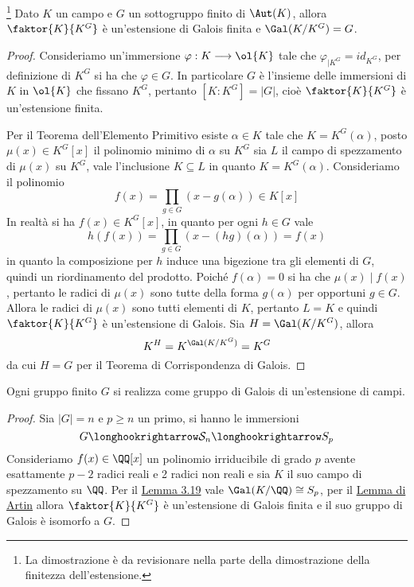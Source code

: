 \documentclass[11pt]{scrartcl}
\begin{document}
	\begin{lemma}
		\footnote{
			La dimostrazione è da revisionare nella parte della dimostrazione 
			della finitezza dell'estensione.
		}
		\label{lemma3.20}
		Dato $K$ un campo e $G$ un sottogruppo finito di $\Aut(K)$, allora 
		$\faktor{K}{K^G}$ è un'estensione di Galois finita e $\Gal(K/K^G) = G$.
	\end{lemma}
	
	\begin{proof}
		Consideriamo un'immersione $\varphi: K \longrightarrow \ol{K}$ tale che
		$\varphi_{\mid K^G} = id_{K^G}$, per definizione di $K^G$ si ha che 
		$\varphi \in G$. In particolare $G$ è l'insieme delle immersioni di $K$
		in $\ol{K}$ che fissano $K^G$, pertanto $[K:K^G] = |G|$, cioè $\faktor{K}{K^G}$
		è un'estensione finita. 
		
		Per il Teorema dell'Elemento Primitivo esiste $\alpha \in K$ tale che 
		$K = K^G(\alpha)$, posto $\mu(x) \in K^G[x]$ il polinomio minimo di $\alpha$
		su $K^G$ sia $L$ il campo di spezzamento di $\mu(x)$ su $K^G$, vale
		l'inclusione $K \subseteq L$ in quanto $K = K^G(\alpha)$. Consideriamo 
		il polinomio 
		\[
		f(x) = \prod_{g \in G}(x - g(\alpha)) \in K[x]
		\]
		In realtà si ha $f(x) \in K^G[x]$, in quanto per ogni $h \in G$ vale 
		\[
		h(f(x)) = \prod_{g \in G}(x - (hg)(\alpha)) = f(x)
		\]
		in quanto la composizione per $h$ induce una bigezione tra gli elementi di $G$,
		quindi un riordinamento del prodotto. Poiché $f(\alpha) = 0$ si ha che
		$\mu(x)\mid f(x)$, pertanto le radici di $\mu(x)$ sono tutte della forma
		$g(\alpha)$ per opportuni $g \in G$. Allora le radici di $\mu(x)$ sono
		tutti elementi di $K$, pertanto $L = K$ e quindi $\faktor{K}{K^G}$ è 
		un'estensione di Galois. Sia $H = \Gal(K/K^G)$, allora
		\[
		K^H = K^{\Gal(K/K^G)} = K^G
		\]
		da cui $H = G$ per il Teorema di Corrispondenza di Galois.
	\end{proof}
	
	\begin{proposition}
		Ogni gruppo finito $G$ si realizza come gruppo di Galois di un'estensione
		di campi.
	\end{proposition}
	
	\begin{proof}
		Sia $|G| = n$ e $p \geq n$ un primo, si hanno le immersioni
		\[
		G \longhookrightarrow \mathcal{S}_n \longhookrightarrow S_p
		\]
		Consideriamo $f(x) \in \QQ[x]$ un polinomio irriducibile di grado $p$
		avente esattamente $p - 2$ radici reali e 2 radici non reali e sia $K$ 
		il suo campo di spezzamento su $\QQ$. Per il \hyperref[lemma3.19]{Lemma 3.19}
		vale $\Gal(K/\QQ) \cong S_p$, per il \hyperref[lemma3.20]{Lemma di Artin}
		allora $\faktor{K}{K^G}$ è un'estensione di Galois finita e il suo gruppo
		di Galois è isomorfo a $G$.
	\end{proof}
	
\end{document}
